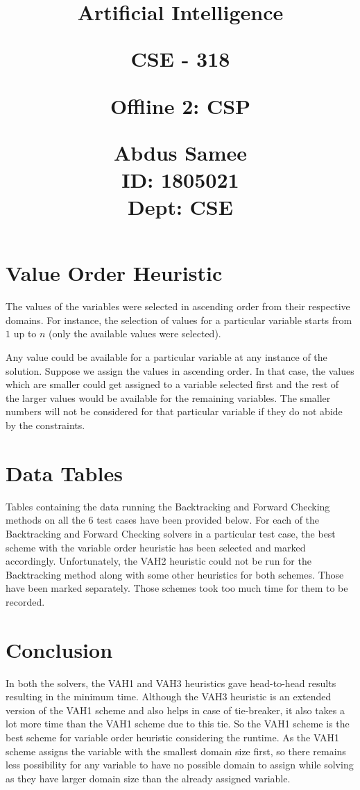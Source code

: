 \documentclass{article}
\title{%
  \begin{center}
        \vspace*{1cm}
            
        \Huge
        \textbf{Artificial Intelligence}
            
        \vspace{0.5cm}
        \LARGE
        CSE - 318
            
        \vspace{1.5cm}
            
        \textbf{Offline 2: CSP}
                        
        \vspace{0.8cm}
                        
        \Large
        Abdus Samee\\
        ID: 1805021\\
        Dept: CSE\\
    \end{center}
  }
\date{}
\begin{document}
\maketitle
\newpage

\section{Value Order Heuristic}
The values of the variables were selected in ascending order from their respective domains. For instance, the selection of values for a particular variable starts from $1$ up to $n$ (only the available values were selected). 


Any value could be available for a particular variable at any instance of the solution. Suppose we assign the values in ascending order. In that case, the values which are smaller could get assigned to a variable selected first and the rest of the larger values would be available for the remaining variables. The smaller numbers will not be considered for that particular variable if they do not abide by the constraints.

\section{Data Tables}
Tables containing the data running the Backtracking and Forward Checking methods on all the $6$ test cases have been provided below. For each of the Backtracking and Forward Checking solvers in a particular test case, the best scheme with the variable order heuristic has been selected and marked accordingly. Unfortunately, the VAH2 heuristic could not be run for the Backtracking method along with some other heuristics for both schemes. Those have been marked separately. Those schemes took too much time for them to be recorded.

\section{Conclusion}
In both the solvers, the VAH1 and VAH3 heuristics gave head-to-head results resulting in the minimum time. Although the VAH3 heuristic is an extended version of the VAH1 scheme and also helps in case of tie-breaker, it also takes a lot more time than the VAH1 scheme due to this tie. So the VAH1 scheme is the best scheme for variable order heuristic considering the runtime. As the VAH1 scheme assigns the variable with the smallest domain size first, so there remains less possibility for any variable to have no possible domain to assign while solving as they have larger domain size than the already assigned variable.
\end{document}

